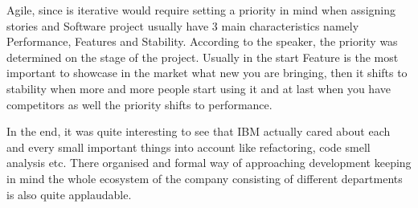 Agile, since is iterative would require setting a priority in mind when assigning stories and Software project usually have 3 main characteristics namely Performance, Features and Stability. According to the speaker, the priority was determined on the stage of the project. Usually in the start Feature is the most important to showcase in the market what new you are bringing, then it shifts to stability when more and more people start using it and at last when you have competitors as well the priority shifts to performance.

In the end, it was quite interesting to see that IBM actually cared about each and every small important things into account like refactoring, code smell analysis etc. There organised and formal way of approaching development keeping in mind the whole ecosystem of the company consisting of different departments is also quite applaudable.